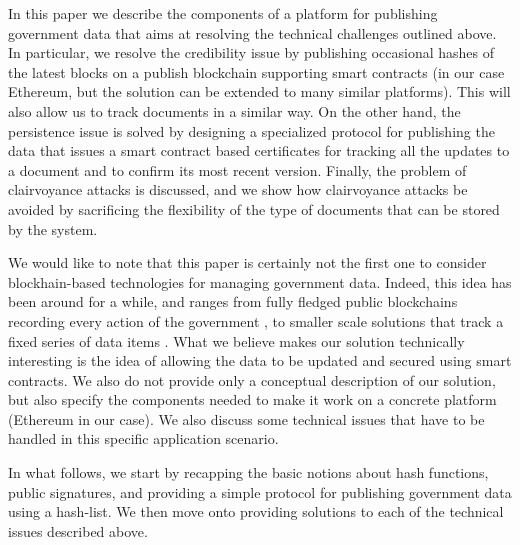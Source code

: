 In this paper we describe the components of a platform for publishing government data that aims at resolving the technical challenges outlined above. In particular, 
we resolve the credibility issue by publishing occasional hashes of the latest blocks on a publish blockchain supporting smart contracts (in our case Ethereum, but the solution can be extended to many similar platforms). This will also allow us to track documents in a similar way. On the other hand, the persistence issue is solved by designing a specialized protocol for publishing the data that issues a smart contract based certificates for tracking all the updates to a document and to confirm its most recent version. Finally, the problem of clairvoyance attacks is discussed, and we show how clairvoyance attacks be avoided by sacrificing the flexibility of the type of documents that can be stored by the system.


We would like to note that this paper is certainly not the first one to consider blockhain-based technologies for managing government data. Indeed, this idea has been around for a while, and ranges from fully fledged public blockchains recording every action of the government \cite{eushit,ibmshit}, to smaller scale solutions that track a fixed series of data items \cite{energiaabierta}. What we believe makes our solution technically interesting is the idea of allowing the data to be updated and secured using smart contracts. We also do not provide only a conceptual description of our solution, but also specify the components needed to make it work on a concrete platform (Ethereum in our case). We also discuss some technical issues that have to be handled in this specific application scenario.

In what follows, we start by recapping the basic notions about hash functions, public signatures, and providing a simple protocol for publishing government data using a hash-list. We then move onto providing solutions to each of the technical issues described above.